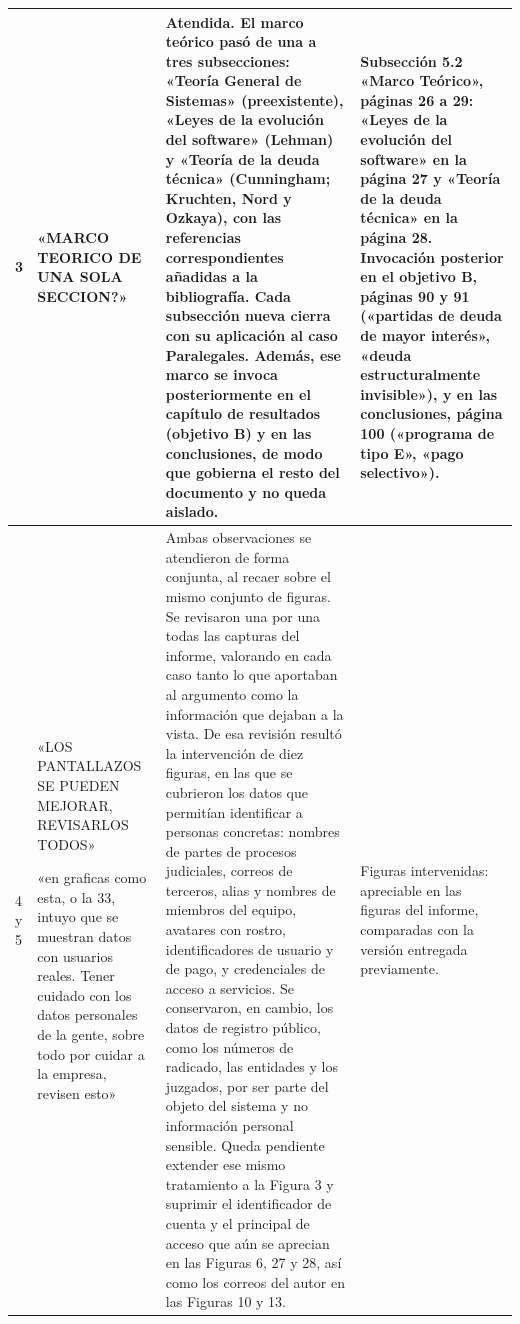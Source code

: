 \documentclass[11pt]{article}
\begin{document}
\begin{longtable}{@{}Z{1.0cm} C{6.7cm} C{9.2cm} C{6.2cm}@{}}
  3 &
  «MARCO TEORICO DE UNA SOLA SECCION?» &
  Atendida. El marco teórico pasó de una a tres subsecciones: «Teoría General de Sistemas»
  (preexistente), «Leyes de la evolución del software» (Lehman) y «Teoría de la deuda técnica»
  (Cunningham; Kruchten, Nord y Ozkaya), con las referencias correspondientes añadidas a la
  bibliografía. Cada subsección nueva cierra con su aplicación al caso Paralegales. Además, ese marco
  se invoca posteriormente en el capítulo de resultados (objetivo B) y en las conclusiones, de modo
  que gobierna el resto del documento y no queda aislado. &
  Subsección 5.2 «Marco Teórico», páginas 26 a 29: «Leyes de la evolución del software» en la página
  27 y «Teoría de la deuda técnica» en la página 28. Invocación posterior en el objetivo B, páginas 90
  y 91 («partidas de deuda de mayor interés», «deuda estructuralmente invisible»), y en las
  conclusiones, página 100 («programa de tipo E», «pago selectivo»). \\
  \midrule

  4 y 5 &
  «LOS PANTALLAZOS SE PUEDEN MEJORAR, REVISARLOS TODOS»

  \vspace{0.5em}
  «en graficas como esta, o la 33, intuyo que se muestran datos con usuarios reales. Tener cuidado con
  los datos personales de la gente, sobre todo por cuidar a la empresa, revisen esto» &
  Ambas observaciones se atendieron de forma conjunta, al recaer sobre el mismo conjunto de figuras. Se
  revisaron una por una todas las capturas del informe, valorando en cada caso tanto lo que aportaban
  al argumento como la información que dejaban a la vista. De esa revisión resultó la intervención de
  diez figuras, en las que se cubrieron los datos que permitían identificar a personas concretas:
  nombres de partes de procesos judiciales, correos de terceros, alias y nombres de miembros del
  equipo, avatares con rostro, identificadores de usuario y de pago, y credenciales de acceso a
  servicios. Se conservaron, en cambio, los datos de registro público, como los números de radicado,
  las entidades y los juzgados, por ser parte del objeto del sistema y no información personal
  sensible. Queda pendiente extender ese mismo tratamiento a la Figura 3 y suprimir el identificador
  de cuenta y el principal de acceso que aún se aprecian en las Figuras 6, 27 y 28, así como los
  correos del autor en las Figuras 10 y 13. &
  Figuras intervenidas: apreciable en las figuras del informe, comparadas con la versión entregada
  previamente.


\end{longtable}
\end{document}
